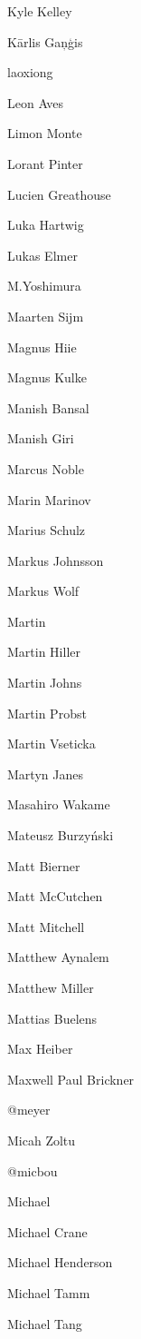 \begin{DoxyItemize}
\item Kyle Kelley
\item Kārlis Gaņģis
\item laoxiong
\item Leon Aves
\item Limon Monte
\item Lorant Pinter
\item Lucien Greathouse
\item Luka Hartwig
\item Lukas Elmer
\item M.\+Yoshimura
\item Maarten Sijm
\item Magnus Hiie
\item Magnus Kulke
\item Manish Bansal
\item Manish Giri
\item Marcus Noble
\item Marin Marinov
\item Marius Schulz
\item Markus Johnsson
\item Markus Wolf
\item Martin
\item Martin Hiller
\item Martin Johns
\item Martin Probst
\item Martin Vseticka
\item Martyn Janes
\item Masahiro Wakame
\item Mateusz Burzyński
\item Matt Bierner
\item Matt Mc\+Cutchen
\item Matt Mitchell
\item Matthew Aynalem
\item Matthew Miller
\item Mattias Buelens
\item Max Heiber
\item Maxwell Paul Brickner
\item @meyer
\item Micah Zoltu
\item @micbou
\item Michael
\item Michael Crane
\item Michael Henderson
\item Michael Tamm
\item Michael Tang

\end{DoxyItemize}

